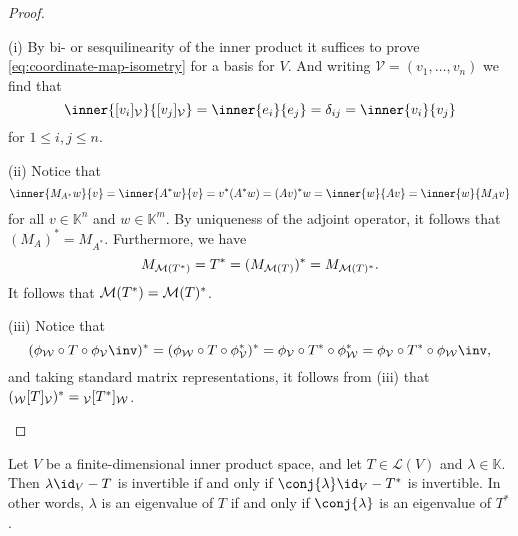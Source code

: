 \documentclass[article, a4paper, 11pt, oneside]{memoir}
\numberwithin{equation}{chapter}
\newcommand{\calL}{\mathcal{L}}
\newcommand{\calV}{\mathcal{V}}
\newcommand{\calW}{\mathcal{W}}
\begin{document}
\begin{proof}
\begin{proofsec}
    \item[(i)]
    By bi- or sesquilinearity of the inner product it suffices to prove \cref{eq:coordinate-map-isometry} for a basis for $V$. And writing $\calV = (v_1, \ldots, v_n)$ we find that
    \begin{equation*}
        \inner{\coordvec{v_i}{\calV}}{\coordvec{v_j}{\calV}}
            = \inner{e_i}{e_j}
            = \delta_{ij}
            = \inner{v_i}{v_j}
    \end{equation*}
    for $1 \leq i,j \leq n$.

    \item[(ii)]
    Notice that
    \begin{equation*}
        \inner{M_{A^*} w}{v}
            = \inner{A^* w}{v}
            = v^* (A^* w)
            = (Av)^* w
            = \inner{w}{Av}
            = \inner{w}{M_A v}
    \end{equation*}
    for all $v \in \mathbb{K}^n$ and $w \in \mathbb{K}^m$. By uniqueness of the adjoint operator, it follows that $(M_A)^* = M_{A^*}$. Furthermore, we have
    \begin{equation*}
        M_{\mathcal{M}(T^*)}
            = T^*
            = (M_{\mathcal{M}(T)})^*
            = M_{\mathcal{M}(T)^*}.
    \end{equation*}
    It follows that $\mathcal{M}(T^*) = \mathcal{M}(T)^*$.

    \item[(iii)]
    Notice that
    \begin{equation*}
        (\coordmap{\calW} \circ T \circ \coordmap{\calV}\inv)^*
            = (\coordmap{\calW} \circ T \circ \coordmap{\calV}^*)^*
            = \coordmap{\calV} \circ T^* \circ \coordmap{\calW}^*
            = \coordmap{\calV} \circ T^* \circ \coordmap{\calW}\inv,
    \end{equation*}
    and taking standard matrix representations, it follows from (iii) that $(\mr{\calW}{T}{\calV})^* = \mr{\calV}{T^*}{\calW}$.
\end{proofsec}
\end{proof}


\begin{proposition}
    Let $V$ be a finite-dimensional inner product space, and let $T \in \calL(V)$ and $\lambda \in \mathbb{K}$. Then $\lambda \id_V - T$ is invertible if and only if $\conj{\lambda} \id_V - T^*$ is invertible. In other words, $\lambda$ is an eigenvalue of $T$ if and only if $\conj{\lambda}$ is an eigenvalue of $T^*$.
\end{proposition}
\end{document}
